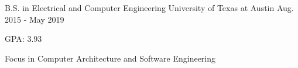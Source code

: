 

\begin{cventries}

  \cventry
    {B.S. in Electrical and Computer Engineering} %
    {University of Texas at Austin} %
    {} %
    {Aug. 2015 - May 2019} %
    {
      \begin{cvitems} %
        \item {GPA: 3.93}
        \item {Focus in Computer Architecture and Software Engineering}
      \end{cvitems}
    }

\end{cventries}
